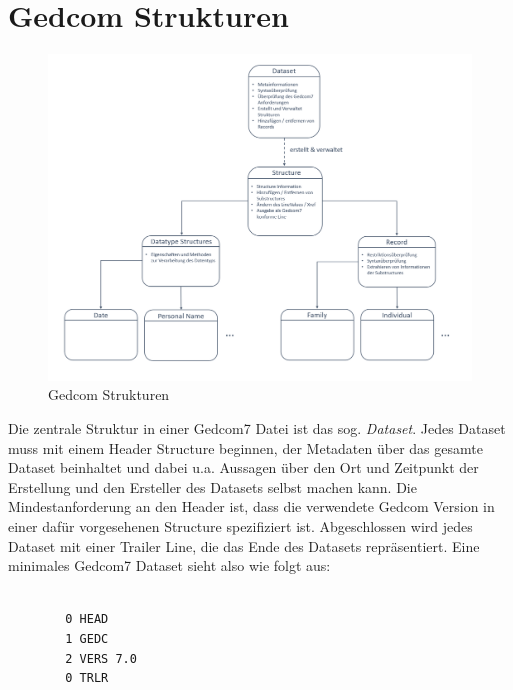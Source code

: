 \section{Gedcom Strukturen}
\label{sec: Konzept - Gedcom Strukturen}
\begin{figure}[b]
	\centering
	\includegraphics[width=1.0\textwidth]{images/konzept_structure.png}
	\caption{Gedcom Strukturen}
	\label{fig: Gedcom Strukturen}
\end{figure}
Die zentrale Struktur in einer Gedcom7 Datei ist das sog. \textit{Dataset}. Jedes Dataset muss mit einem Header Structure beginnen, der Metadaten über das gesamte Dataset beinhaltet und dabei u.a. Aussagen über den Ort und Zeitpunkt der Erstellung und den Ersteller des Datasets selbst machen kann. Die Mindestanforderung an den Header ist, dass die verwendete Gedcom Version in einer dafür vorgesehenen Structure spezifiziert ist. Abgeschlossen wird jedes Dataset mit einer Trailer Line, die das Ende des Datasets repräsentiert. Eine minimales Gedcom7 Dataset sieht also wie folgt aus:
\\ \\
\begin{minipage}{1.0\textwidth} \small
	\begin{lstlisting}
		0 HEAD
		1 GEDC
		2 VERS 7.0
		0 TRLR
	\end{lstlisting}
	\label{lst: minimales dataset}
\end{minipage}
\\ \\
